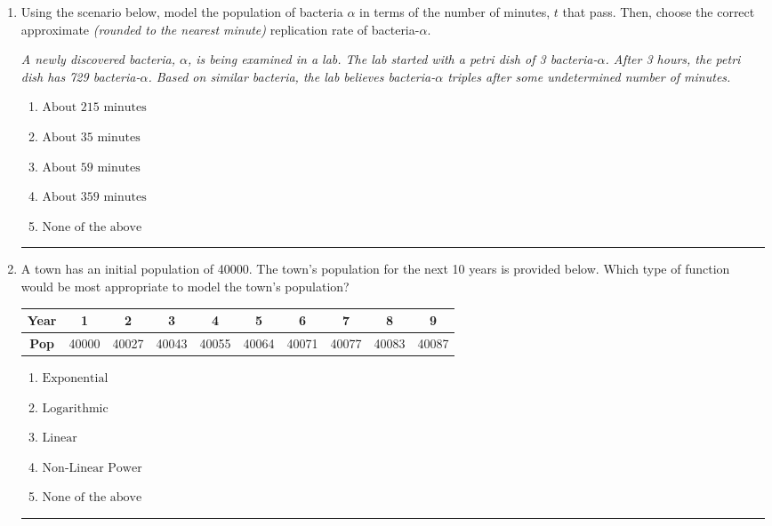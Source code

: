 \documentclass[14pt]{extbook}
\newcommand{\litem}[1]{\item#1\hspace*{-1cm}\rule{\textwidth}{0.4pt}}
\begin{document}
\begin{enumerate}
{\begin{enumerate}[label=\Alph*.]
\end{enumerate} }
\litem{
Using the scenario below, model the population of bacteria $\alpha$ in terms of the number of minutes, $t$ that pass. Then, choose the correct approximate \textit{(rounded to the nearest minute)} replication rate of bacteria-$\alpha$.
\begin{center}
    \textit{ A newly discovered bacteria, $\alpha$, is being examined in a lab. The lab started with a petri dish of 3 bacteria-$\alpha$. After 3 hours, the petri dish has 729 bacteria-$\alpha$. Based on similar bacteria, the lab believes bacteria-$\alpha$ triples after some undetermined number of minutes. }
\end{center}
\begin{enumerate}[label=\Alph*.]
\item \( \text{About } 215 \text{ minutes} \)
\item \( \text{About } 35 \text{ minutes} \)
\item \( \text{About } 59 \text{ minutes} \)
\item \( \text{About } 359 \text{ minutes} \)
\item \( \text{None of the above} \)

\end{enumerate} }
\litem{
A town has an initial population of 40000. The town's population for the next 10 years is provided below. Which type of function would be most appropriate to model the town's population?

\begin{tabular}{c|c|c|c|c|c|c|c|c|c}
\textbf{Year} &1 &2 &3 &4 &5 &6 &7 &8 &9\tabularnewline \hline
\textbf{Pop} &40000 &40027 &40043 &40055 &40064 &40071 &40077 &40083 &40087\end{tabular}\begin{enumerate}[label=\Alph*.]
\item \( \text{Exponential} \)
\item \( \text{Logarithmic} \)
\item \( \text{Linear} \)
\item \( \text{Non-Linear Power} \)
\item \( \text{None of the above} \)


\end{enumerate}}
\end{enumerate}
\end{document}
